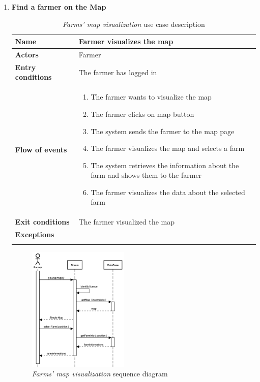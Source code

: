 \begin{enumerate}
    \item \textbf{Find a farmer on the Map}
    \begin{longtable}{p{0.26\linewidth}p{0.75\linewidth}}
        \toprule
        \textbf{Name} & \textbf{Farmer visualizes the map} \\
        \midrule
        \textbf{Actors} & Farmer \\
        \midrule
        \textbf{Entry conditions} & The farmer has logged in\\
        \midrule
        \textbf{Flow of events} & 
        \begin{enumerate}
            \item The farmer wants to visualize the map
            \item The farmer clicks on map button
            \item The system sends the farmer to the map page
            \item The farmer visualizes the map and selects a farm
            \item The system retrieves the information about the farm and shows them to the farmer
            \item The farmer visualizes the data about the selected farm
        \end{enumerate} \\
        \midrule
        \textbf{Exit conditions} & The farmer visualized the map\\
        \midrule
        \textbf{Exceptions} & \\
        \bottomrule
        \caption{\emph{Farms' map visualization} use case description}
    \end{longtable}
    \begin{figure}[H]
        \begin{center}
        \includegraphics[width=0.45\textwidth]{sequence/VisializeMap.png}
        \caption{\emph{Farms' map visualization} sequence diagram}
        \label{fig:sequence5}
        \end{center}
    \end{figure}
    

\end{enumerate}
